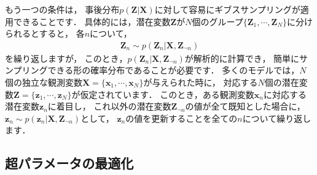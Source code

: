 もう一つの条件は，
事後分布$p(\bm{Z}|\bm{X})$に対して容易にギブスサンプリングが適用できることです．
具体的には，潜在変数$\bm{Z}$が$N$個のグループ$\{\bm{Z}_1,\cdots,\bm{Z}_N\}$に分けられるとすると，
各$n$について，
\begin{align}
\bm{Z}_n
\sim
p(\bm{Z}_n | \bm{X},\bm{Z}_{\neg n})
\end{align}
を繰り返しますが，
このとき，$p(\bm{Z}_n | \bm{X},\bm{Z}_{\neg n})$が解析的に計算でき，
簡単にサンプリングできる形の確率分布であることが必要です．
多くのモデルでは，$N$個の独立な観測変数$\bm{X}=\{\bm{x}_1,\cdots,\bm{x}_N\}$が与えられた時に，
対応する$N$個の潜在変数$\bm{Z}=\{\bm{z}_1,\cdots,\bm{z}_N\}$が仮定されています．
このとき，ある観測変数$\bm{x}_n$に対応する潜在変数$\bm{z}_n$に着目し，
これ以外の潜在変数$\bm{Z}_{\neg n}$の値が全て既知とした場合に，
$\bm{z}_n \sim p(\bm{z}_n | \bm{X}, \bm{Z}_{\neg n})$として，
$\bm{z}_n$の値を更新することを全ての$n$について繰り返します．

\subsection{超パラメータの最適化}

